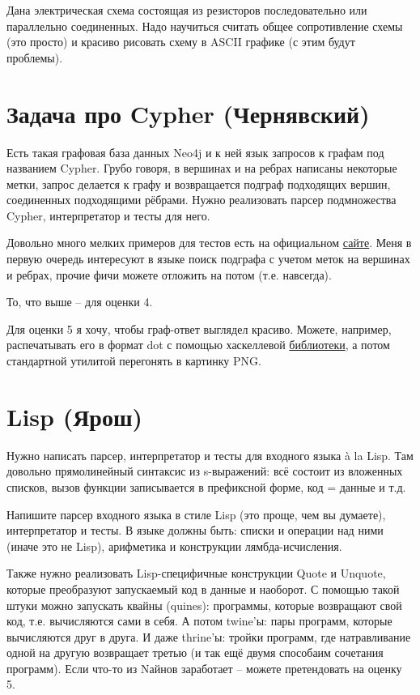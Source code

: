 \documentclass[a4paper,14pt]{article}
\begin{document}
Дана электрическая схема состоящая из резисторов последовательно или параллельно соединенных. Надо научиться считать общее сопротивление схемы (это просто) и красиво рисовать схему в ASCII графике (с этим будут проблемы).

\section{Задача про Cypher (Чернявский)}

Есть такая графовая база данных Neo4j и к ней язык запросов к графам под названием Cypher. Грубо говоря, в вершинах и на ребрах написаны некоторые метки, запрос делается к графу и возвращается подграф подходящих вершин, соединенных подходящими рёбрами. Нужно реализовать парсер подмножества Cypher, интерпретатор и тесты для него.

Довольно много мелких примеров для тестов есть на официальном \href{https://neo4j.com/graphgists}{сайте}. Меня в первую очередь интересуют в языке поиск подграфа с учетом меток на вершинах и ребрах, прочие фичи можете отложить на потом (т.е. навсегда).

То, что выше -- для оценки 4. 

Для оценки 5 я хочу, чтобы граф-ответ выглядел красиво. Можете, например, распечатывать его в формат dot с помощью хаскеллевой \href{http://hackage.haskell.org/package/graphviz-2999.20.0.3/docs/Data-GraphViz-Types.html}{библиотеки}, а потом стандартной утилитой перегонять в картинку PNG.

\section{Lisp (Ярош)}

Нужно написать парсер, интерпретатор и тесты для входного языка \`a la Lisp. Там довольно прямолинейный синтаксис из s-выражений: всё состоит из вложенных списков, вызов функции записывается в префиксной форме, код = данные и т.д.

Напишите парсер входного языка в стиле Lisp (это проще, чем вы думаете), интерпретатор и тесты. В языке должны быть: списки и операции над ними (иначе это не Lisp), арифметика и конструкции лямбда-исчисления.

Также нужно реализовать Lisp-специфичные конструкции Quote и Unquote, которые преобразуют запускаемый код в данные и наоборот. С помощью такой штуки можно запускать квайны (quines): программы, которые возвращают свой код, т.е. вычисляются сами в себя. А потом twine'ы: пары программ, которые вычисляются друг в друга. И даже thrine'ы: тройки программ, где натравливание одной на другую возвращает третью (и так ещё двумя способаим сочетания программ). Если что-то из Nайнов заработает -- можете претендовать на оценку 5.
\end{document}
